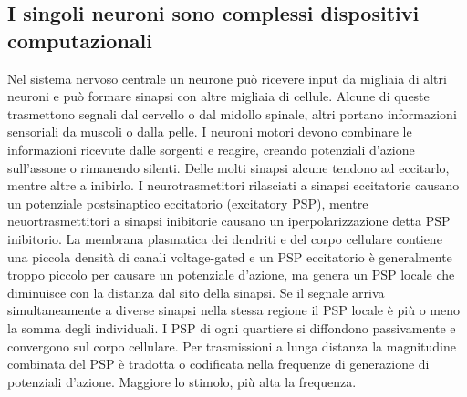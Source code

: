 \subsection{I singoli neuroni sono complessi dispositivi computazionali}
Nel sistema nervoso centrale un neurone pu\`o ricevere input da migliaia di altri neuroni e pu\`o formare sinapsi con altre migliaia di cellule. Alcune di queste trasmettono segnali 
dal cervello o dal midollo spinale, altri portano informazioni sensoriali da muscoli o dalla pelle. I neuroni motori devono combinare le informazioni ricevute dalle sorgenti e 
reagire, creando potenziali d'azione sull'assone o rimanendo silenti. Delle molti sinapsi alcune tendono ad eccitarlo, mentre altre a inibirlo. I neurotrasmetitori rilasciati a
sinapsi eccitatorie causano un potenziale postsinaptico eccitatorio (excitatory PSP), mentre neuortrasmettitori a sinapsi inibitorie causano un iperpolarizzazione detta PSP inibitorio.
La membrana plasmatica dei dendriti e del corpo cellulare contiene una piccola densit\`a di canali  voltage-gated e un PSP eccitatorio \`e generalmente troppo piccolo per 
causare un potenziale d'azione, ma genera un PSP locale che diminuisce con la distanza dal sito della sinapsi. Se il segnale arriva simultaneamente a diverse sinapsi nella stessa 
regione il PSP locale \`e pi\`u o meno la somma degli individuali. I PSP di ogni quartiere si diffondono passivamente e convergono sul corpo cellulare. Per trasmissioni a lunga 
distanza la magnitudine combinata del PSP \`e tradotta o codificata nella frequenze di generazione di potenziali d'azione. Maggiore lo stimolo, pi\`u alta la frequenza. 
